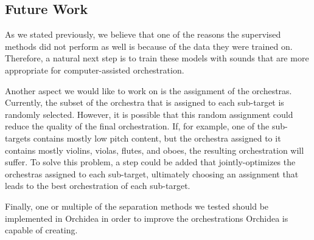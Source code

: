 \documentclass{article}
\begin{document}
		\subsection{Future Work}\label{sec:futurework}	
		As we stated previously, we believe that one of the reasons the supervised methods did not perform as well is because of the data they were trained on. Therefore, a natural next step is to train these models with sounds that are more appropriate for computer-assisted orchestration.
		
		Another aspect we would like to work on is the assignment of the orchestras. Currently, the subset of the orchestra that is assigned to each sub-target is randomly selected. However, it is possible that this random assignment could reduce the quality of the final orchestration. If, for example, one of the sub-targets contains mostly low pitch content, but the orchestra assigned to it contains mostly violins, violas, flutes, and oboes, the resulting orchestration will suffer. To solve this problem, a step could be added that jointly-optimizes the orchestras assigned to each sub-target, ultimately choosing an assignment that leads to the best orchestration of each sub-target.
		
		Finally, one or multiple of the separation methods we tested should be implemented in Orchidea in order to improve the orchestrations Orchidea is capable of creating. 
	
	
	
\end{document}
